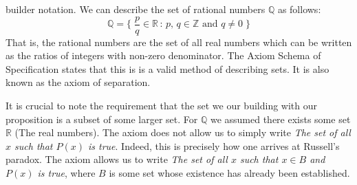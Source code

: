         builder notation. We can describe the set of rational numbers
        $\mathbb{Q}$ as follows:
        \begin{equation}
            \mathbb{Q}=\Big\{\;\frac{p}{q}\in\mathbb{R}\,:\,p,\,q\in\mathbb{Z}
                               \textrm{ and }q\ne{0}\;\Big\}
        \end{equation}
        That is, the rational numbers are the set of all real numbers which
        can be written as the ratios of integers with non-zero denominator.
        The Axiom Schema of Specification states that this is is a valid
        method of describing sets. It is also known as the axiom of separation.
        \par\hfill\par
        It is crucial to note the requirement that the set we our building with
        our proposition is a subset of some larger set. For $\mathbb{Q}$ we
        assumed there exists some set $\mathbb{R}$ (The real numbers). The
        axiom does not allow us to simply write
        \textit{The set of all $x$ such that $P(x)$ is true}. Indeed, this is
        precisely how one arrives at Russell's paradox. The axiom allows us to
        write
        \textit{The set of all $x$ such that $x\in{B}$ and $P(x)$ is true},
        where $B$ is some set whose existence has already been established.
